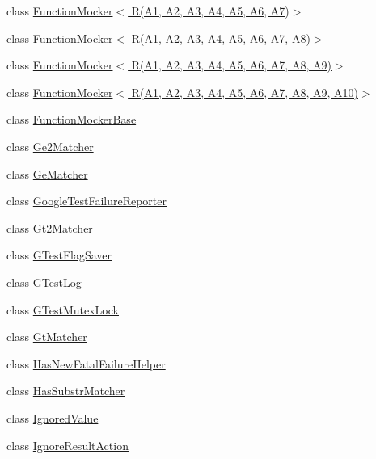 \begin{DoxyCompactItemize}
\item 
class \hyperlink{classtesting_1_1internal_1_1FunctionMocker_3_01R_07A1_00_01A2_00_01A3_00_01A4_00_01A5_00_01A6_00_01A7_08_4}{Function\+Mocker$<$ R(\+A1, A2, A3, A4, A5, A6, A7)$>$}
\item 
class \hyperlink{classtesting_1_1internal_1_1FunctionMocker_3_01R_07A1_00_01A2_00_01A3_00_01A4_00_01A5_00_01A6_00_01A7_00_01A8_08_4}{Function\+Mocker$<$ R(\+A1, A2, A3, A4, A5, A6, A7, A8)$>$}
\item 
class \hyperlink{classtesting_1_1internal_1_1FunctionMocker_3_01R_07A1_00_01A2_00_01A3_00_01A4_00_01A5_00_01A6_00_01A7_00_01A8_00_01A9_08_4}{Function\+Mocker$<$ R(\+A1, A2, A3, A4, A5, A6, A7, A8, A9)$>$}
\item 
class \hyperlink{classtesting_1_1internal_1_1FunctionMocker_3_01R_07A1_00_01A2_00_01A3_00_01A4_00_01A5_00_01A6_0079295c90ba14a714e84d5a856a5b50dd}{Function\+Mocker$<$ R(\+A1, A2, A3, A4, A5, A6, A7, A8, A9, A10)$>$}
\item 
class \hyperlink{classtesting_1_1internal_1_1FunctionMockerBase}{Function\+Mocker\+Base}
\item 
class \hyperlink{classtesting_1_1internal_1_1Ge2Matcher}{Ge2\+Matcher}
\item 
class \hyperlink{classtesting_1_1internal_1_1GeMatcher}{Ge\+Matcher}
\item 
class \hyperlink{classtesting_1_1internal_1_1GoogleTestFailureReporter}{Google\+Test\+Failure\+Reporter}
\item 
class \hyperlink{classtesting_1_1internal_1_1Gt2Matcher}{Gt2\+Matcher}
\item 
class \hyperlink{classtesting_1_1internal_1_1GTestFlagSaver}{G\+Test\+Flag\+Saver}
\item 
class \hyperlink{classtesting_1_1internal_1_1GTestLog}{G\+Test\+Log}
\item 
class \hyperlink{classtesting_1_1internal_1_1GTestMutexLock}{G\+Test\+Mutex\+Lock}
\item 
class \hyperlink{classtesting_1_1internal_1_1GtMatcher}{Gt\+Matcher}
\item 
class \hyperlink{classtesting_1_1internal_1_1HasNewFatalFailureHelper}{Has\+New\+Fatal\+Failure\+Helper}
\item 
class \hyperlink{classtesting_1_1internal_1_1HasSubstrMatcher}{Has\+Substr\+Matcher}
\item 
class \hyperlink{classtesting_1_1internal_1_1IgnoredValue}{Ignored\+Value}
\item 
class \hyperlink{classtesting_1_1internal_1_1IgnoreResultAction}{Ignore\+Result\+Action}

\end{DoxyCompactItemize}
